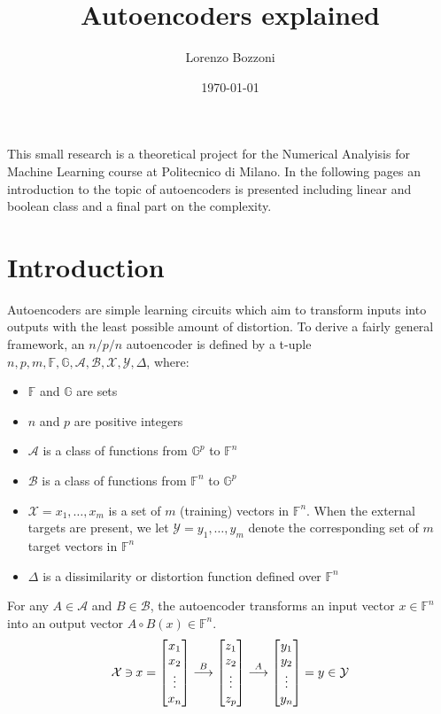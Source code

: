 \documentclass{article}
\title{Autoencoders explained}
\author{Lorenzo Bozzoni}
\date{\today}
\newcommand{\revin}{\mathbin{\rotatebox[origin=c]{180}{$\in$}}}
\begin{document}
\maketitle

This small research is a theoretical project for the Numerical Analyisis for Machine Learning course at Politecnico di Milano. In the following pages an introduction to the topic of autoencoders is presented including linear and boolean class and a final part on the complexity.

\tableofcontents

\section{Introduction}
Autoencoders are simple learning circuits which aim to transform inputs into outputs with
the least possible amount of distortion. To derive a fairly general framework, an $n/p/n$  autoencoder is defined by a t-uple $n,p,m,\mathbb{F},\mathbb{G},\mathcal{A},\mathcal{B},\mathcal{X},\mathcal{Y}, \Delta$, where:
\begin{itemize}
    \item $\mathbb{F}$ and $\mathbb{G}$ are sets
    \item $n$ and $p$ are positive integers
    \item $\mathcal{A}$ is a class of functions from $\mathbb{G}^p$ to $\mathbb{F}^n$
    \item $\mathcal{B}$ is a class of functions from $\mathbb{F}^n$ to $\mathbb{G}^p$
    \item $\mathcal{X} = {x_1, \dots, x_m}$ is a set of $m$ (training) vectors in $\mathbb{F}^n$. When the external targets are present, we let $\mathcal{Y} = {y_1, \dots, y_m}$ denote the corresponding set of $m$ target vectors in $\mathbb{F}^n$ 
    \item $\Delta$ is a dissimilarity or distortion function defined over $\mathbb{F}^n$
\end{itemize}
For any $A \in \mathcal{A}$ and $B \in \mathcal{B}$, the autoencoder transforms an input vector $x \in \mathbb{F}^n$ into an output vector $A \circ B(x) \in \mathbb{F}^n$.
\[
\mathcal{X} \revin x = 
\begin{bmatrix}
    x_1\\
    x_2\\
    \vdots\\
    x_n
\end{bmatrix}
\overset{B}{\longrightarrow}
\begin{bmatrix}
    z_1\\
    z_2\\
    \vdots\\
    z_p
\end{bmatrix}
\overset{A}{\longrightarrow}
\begin{bmatrix}
    y_1\\
    y_2\\
    \vdots\\
    y_n
\end{bmatrix}
= y \in \mathcal{Y}
\]
\end{document}
